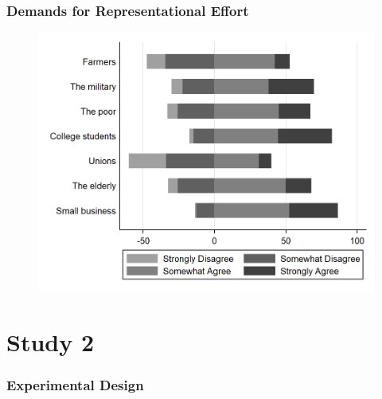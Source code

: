\documentclass[14pt]{beamer}
\begin{document}
\begin{frame}
\frametitle{Demands for Representational Effort}
\begin{figure}
	\centering
	{\includegraphics[width=.8\textwidth]{Figure2}}
\end{figure}
\end{frame}


\section{Study 2}
\begin{frame}
\frametitle{Experimental Design}
\end{frame}
\end{document}
